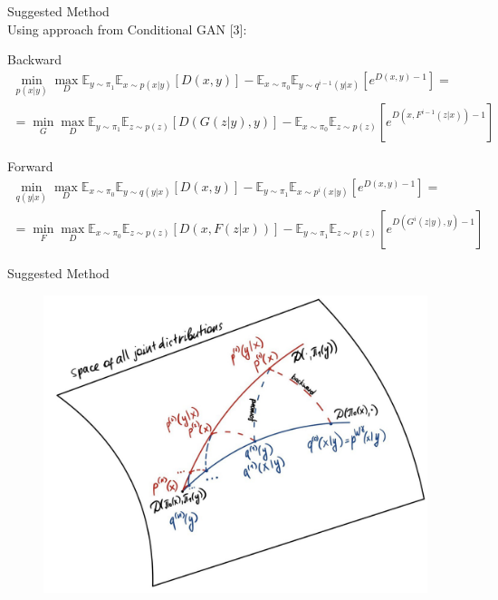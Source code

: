 \documentclass[10pt,pdf,hyperref={unicode}]{beamer}
\begin{document}
\begin{frame}{Suggested Method}
~\\[-1mm]
Using approach from Conditional GAN [3]:
\begin{block}{Backward}
    \begin{equation*}
        \begin{split}
             \min_{p(x|y)}\max_{D}\mathbb{E}_{y \sim \pi_1}\mathbb{E}_{x\sim p(x|y)}\left[D(x,y)\right] - \mathbb{E}_{x\sim\pi_0}\mathbb{E}_{y\sim q^{i-1}(y|x)}\left[e^{D(x,y) - 1}\right] = \\ = \min_{G}\max_{D}\mathbb{E}_{y \sim \pi_1}\mathbb{E}_{z\sim p(z)}\left[D(G(z|y),y)\right] - \mathbb{E}_{x\sim\pi_0}\mathbb{E}_{z\sim p(z)}\left[e^{D(x,F^{i-1}(z|x)) - 1}\right]
        \end{split}
    \end{equation*}
\end{block}

\begin{block}{Forward}
    \begin{equation*}
        \begin{split}
            \min_{q(y|x)}\max_{D}\mathbb{E}_{x\sim \pi_0}\mathbb{E}_{y\sim q(y|x)}\left[D(x,y)\right] - \mathbb{E}_{y\sim \pi_1}\mathbb{E}_{x\sim p^{i}(x|y)}\left[e^{D(x,y) - 1}\right] = \\ = \min_{F}\max_{D}\mathbb{E}_{x\sim \pi_0}\mathbb{E}_{z\sim p(z)}\left[D(x,F(z|x))\right] - \mathbb{E}_{y\sim \pi_1}\mathbb{E}_{z\sim p(z)}\left[e^{D(G^{i}(z|y),y) - 1}\right]
        \end{split}
    \end{equation*}
\end{block}
\end{frame}

\begin{frame}{Suggested Method}
~\\[-1mm]
    \begin{figure}
        \centering
        \includegraphics[width=0.8\linewidth]{slides/3d/figures/photo_2023-12-16_13-49-39.jpg}
    \end{figure}
\end{frame}
\end{document}
